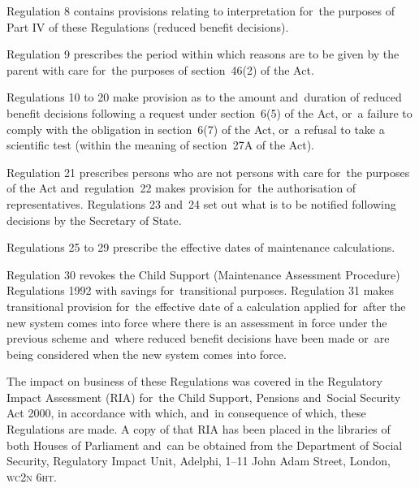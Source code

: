 \documentclass[12pt,a4paper]{article}
\begin{document}
Regulation 8 contains provisions relating to interpretation for~the purposes of Part IV of these Regulations (reduced benefit decisions).

Regulation 9 prescribes the period within which reasons are to be given by the parent with care for~the purposes of section~46(2) of the Act.

Regulations 10 to 20 make provision as to the amount and~duration of reduced benefit decisions following a request under section~6(5) of the Act, or~a failure to comply with the obligation in section~6(7) of the Act, or~a refusal to take a scientific test (within the meaning of section~27A of the Act).

Regulation 21 prescribes persons who are not persons with care for~the purposes of the Act and~regulation~22 makes provision for~the authorisation of representatives. Regulations 23 and~24 set out what is to be notified following decisions by the Secretary of State.

Regulations 25 to 29 prescribe the effective dates of maintenance calculations.

Regulation 30 revokes the Child Support (Maintenance Assessment Procedure) Regulations 1992 with savings for~transitional purposes. Regulation 31 makes transitional provision for~the effective date of a calculation applied for~after the new system comes into force where there is an assessment in force under the previous scheme and~where reduced benefit decisions have been made or~are being considered when the new system comes into force.

The impact on business of these Regulations was covered in the Regulatory Impact Assessment (RIA) for~the Child Support, Pensions and~Social Security Act 2000, in accordance with which, and~in consequence of which, these Regulations are made. A copy of that RIA has been placed in the libraries of both Houses of Parliament and~can be obtained from the Department of Social Security, Regulatory Impact Unit, Adelphi, 1–11 John Adam Street, London, \textsc{\lowercase{WC2N 6HT}}. 
\end{document}
